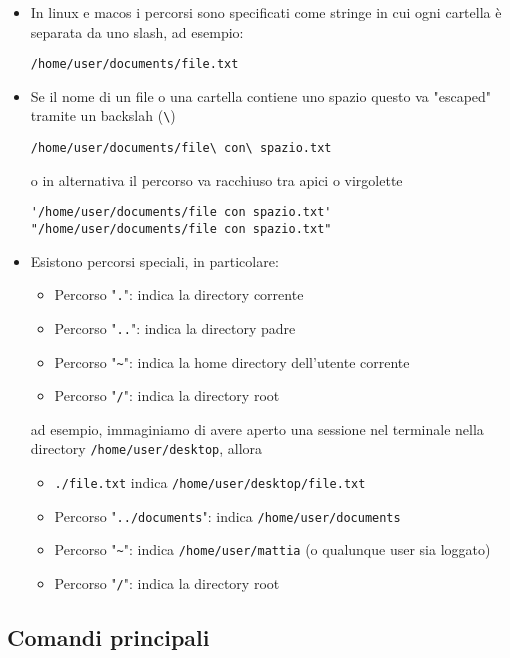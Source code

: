 \begin{itemize}
	\item In linux e macos i percorsi sono specificati come stringe in cui ogni cartella è separata da uno slash, ad esempio:
	      \begin{center}
		      \verb|/home/user/documents/file.txt|
	      \end{center}
	\item Se il nome di un file o una cartella contiene uno spazio questo va "escaped" tramite un backslah (\texttt{\textbackslash})
	      \begin{center}
		      \verb|/home/user/documents/file\ con\ spazio.txt|
	      \end{center}
	      o in alternativa il percorso va racchiuso tra apici o virgolette
	      \begin{center}
		      \verb|'/home/user/documents/file con spazio.txt'|
		      \verb|"/home/user/documents/file con spazio.txt"|
	      \end{center}
	\item Esistono percorsi speciali, in particolare:
	      \begin{itemize}
		      \item Percorso "\verb|.|": indica la directory corrente
		      \item Percorso "\verb|..|": indica la directory padre
		      \item Percorso "\verb|~|": indica la home directory dell'utente corrente
		      \item Percorso "\verb|/|": indica la directory root
	      \end{itemize}
	      ad esempio, immaginiamo di avere aperto una sessione nel terminale nella directory \verb|/home/user/desktop|, allora
	      \begin{itemize}
		      \item \verb|./file.txt| indica \verb|/home/user/desktop/file.txt|
		      \item Percorso "\verb|../documents|":  indica \verb|/home/user/documents|
		      \item Percorso "\verb|~|": indica \verb|/home/user/mattia| (o qualunque user sia loggato)
		      \item Percorso "\verb|/|": indica la directory root
	      \end{itemize}
\end{itemize}
\subsection{Comandi principali}

